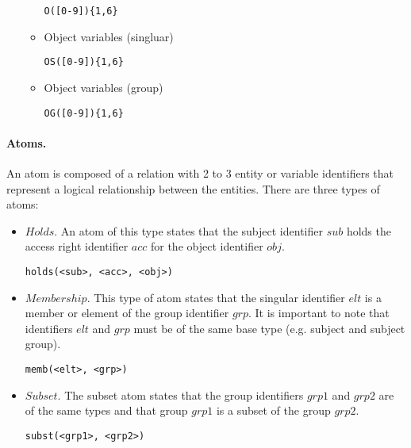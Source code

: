 \documentclass[10pt, twocolumn]{article}
\begin{document}
\begin{itemize}
\begin{itemize}
                  \begin{verbatim}O([0-9]){1,6}\end{verbatim}
                \item
                  Object variables (singluar)

                  \begin{verbatim}OS([0-9]){1,6}\end{verbatim}
                \item
                  Object variables (group)

                  \begin{verbatim}OG([0-9]){1,6}\end{verbatim}
              \end{itemize}
          \end{itemize}

        \paragraph{Atoms.}
          An atom is composed of a relation with 2 to 3 entity or variable
          identifiers that represent a logical relationship between the
          entities. There are three types of atoms:

          \begin{itemize}
            \item
              $Holds$. An atom of this type states that the subject identifier
              $sub$ holds the access right identifier $acc$ for the object
              identifier $obj$.
         
              \begin{verbatim}holds(<sub>, <acc>, <obj>)\end{verbatim}
            \item
              $Membership$. This type of atom states that the singular
              identifier $elt$ is a member or element of the group identifier
              $grp$. It is important to note that identifiers $elt$ and $grp$
              must be of the same base type (e.g. subject and subject group).
         
              \begin{verbatim}memb(<elt>, <grp>)\end{verbatim}
            \item
              $Subset$. The subset atom states that the group identifiers
              $grp1$ and $grp2$ are of the same types and that group $grp1$ is
              a subset of the group $grp2$.

              \begin{verbatim}subst(<grp1>, <grp2>)\end{verbatim}
          \end{itemize}
\end{document}
